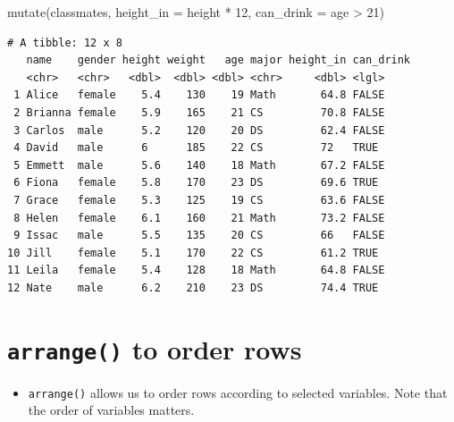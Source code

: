 \documentclass[
  letterpaper,
  DIV=11,
  numbers=noendperiod]{scrreprt}
\newenvironment{Shaded}{\begin{snugshade}}{\end{snugshade}}
\newcommand{\AttributeTok}[1]{\textcolor[rgb]{0.40,0.45,0.13}{#1}}
\newcommand{\DecValTok}[1]{\textcolor[rgb]{0.68,0.00,0.00}{#1}}
\newcommand{\FunctionTok}[1]{\textcolor[rgb]{0.28,0.35,0.67}{#1}}
\newcommand{\NormalTok}[1]{\textcolor[rgb]{0.00,0.23,0.31}{#1}}
\newcommand{\SpecialCharTok}[1]{\textcolor[rgb]{0.37,0.37,0.37}{#1}}
\providecommand{\tightlist}{%
  \setlength{\itemsep}{0pt}\setlength{\parskip}{0pt}}\usepackage{longtable,booktabs,array}
\begin{document}
\begin{tcolorbox}[enhanced jigsaw, colbacktitle=quarto-callout-tip-color!10!white, opacitybacktitle=0.6, breakable, left=2mm, leftrule=.75mm, toprule=.15mm, toptitle=1mm, bottomtitle=1mm, colframe=quarto-callout-tip-color-frame, opacityback=0, coltitle=black, arc=.35mm, titlerule=0mm, colback=white, bottomrule=.15mm, title=\textcolor{quarto-callout-tip-color}{\faLightbulb}\hspace{0.5em}{Answer}, rightrule=.15mm]

\begin{Shaded}
\begin{Highlighting}[]
\FunctionTok{mutate}\NormalTok{(classmates, }\AttributeTok{height\_in =}\NormalTok{ height }\SpecialCharTok{*} \DecValTok{12}\NormalTok{, }\AttributeTok{can\_drink =}\NormalTok{ age }\SpecialCharTok{\textgreater{}} \DecValTok{21}\NormalTok{)}
\end{Highlighting}
\end{Shaded}

\begin{verbatim}
# A tibble: 12 x 8
   name    gender height weight   age major height_in can_drink
   <chr>   <chr>   <dbl>  <dbl> <dbl> <chr>     <dbl> <lgl>    
 1 Alice   female    5.4    130    19 Math       64.8 FALSE    
 2 Brianna female    5.9    165    21 CS         70.8 FALSE    
 3 Carlos  male      5.2    120    20 DS         62.4 FALSE    
 4 David   male      6      185    22 CS         72   TRUE     
 5 Emmett  male      5.6    140    18 Math       67.2 FALSE    
 6 Fiona   female    5.8    170    23 DS         69.6 TRUE     
 7 Grace   female    5.3    125    19 CS         63.6 FALSE    
 8 Helen   female    6.1    160    21 Math       73.2 FALSE    
 9 Issac   male      5.5    135    20 CS         66   FALSE    
10 Jill    female    5.1    170    22 CS         61.2 TRUE     
11 Leila   female    5.4    128    18 Math       64.8 FALSE    
12 Nate    male      6.2    210    23 DS         74.4 TRUE     
\end{verbatim}

\end{tcolorbox}

\section{\texorpdfstring{\texttt{arrange()} to order
rows}{arrange() to order rows}}\label{arrange-to-order-rows}

\begin{itemize}
\tightlist
\item
  \texttt{arrange()} allows us to order rows according to selected
  variables. Note that the order of variables matters.
\end{itemize}
\end{document}

